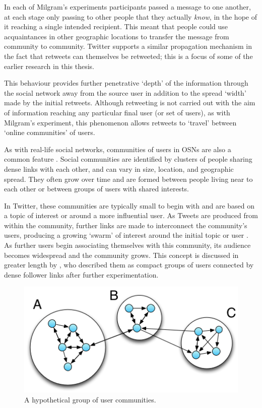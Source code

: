 In each of Milgram's experiments participants passed a message to one another, at each stage only passing to other people that they actually \textit{know}, in the hope of it reaching a single intended recipient. This meant that people could use acquaintances in other geographic locations to transfer the message from community to community. Twitter supports a similar propagation mechanism in the fact that retweets can themselves be retweeted; this is a focus of some of the earlier research in this thesis.

This behaviour provides further penetrative `depth' of the information through the social network away from the source user in addition to the spread `width' made by the initial retweets. Although retweeting is not carried out with the aim of information reaching any particular final user (or set of users), as with Milgram's experiment, this phenomenon allows retweets to `travel' between `online communities' of users.

As with real-life social networks, communities of users in OSNs are also a common feature \cite{ugander11}. Social communities are identified by clusters of people sharing dense links with each other, and can vary in size, location, and geographic spread. They often grow over time and are formed between people living near to each other or between groups of users with shared interests.

In Twitter, these communities are typically small to begin with and are based on a topic of interest or around a more influential user. As Tweets are produced from within the community, further links are made to interconnect the community's users, producing a growing `swarm' of interest around the initial topic or user \cite{java07}. As further users begin associating themselves with this community, its audience becomes widespread and the community grows. This concept is discussed in greater length by \citet{java07}, who described them as compact groups of users connected by dense follower links after further experimentation.

\begin{figure}[h]
\centering
\includegraphics[scale=0.7]{2.Background/Media/communities.png} 
\caption{A hypothetical group of user communities.}
\label{fig:communities}
\end{figure}

